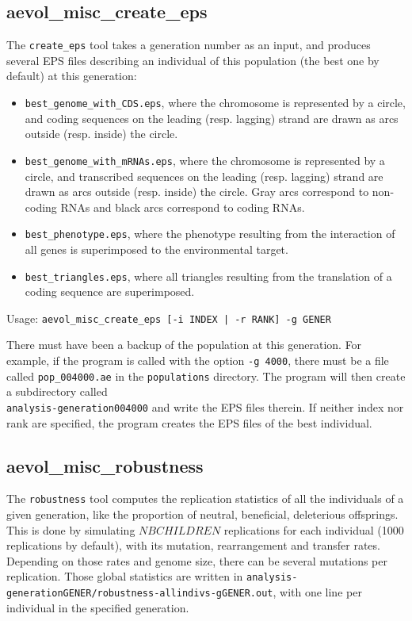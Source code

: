 \subsection{aevol\_misc\_create\_eps}
\label{sect:create-eps}
The \verb?create_eps? tool takes a generation number as an input, and produces several EPS files describing an individual of this population (the best one by default) at this generation:
\begin{itemize}
\item \verb?best_genome_with_CDS.eps?, where the chromosome is represented by a circle, and coding sequences on the leading (resp. lagging) strand are drawn as arcs outside (resp. inside) the circle.
\item \verb?best_genome_with_mRNAs.eps?, where the chromosome is represented by a circle, and transcribed sequences on the leading (resp. lagging) strand are drawn as arcs outside (resp. inside) the circle. Gray arcs correspond to non-coding RNAs and black arcs correspond to coding RNAs.
\item \verb?best_phenotype.eps?, where the phenotype resulting from the interaction of all genes is superimposed to the environmental target.
\item \verb?best_triangles.eps?, where all triangles resulting from the translation of a coding sequence are superimposed.
\end{itemize}

Usage: \verb?aevol_misc_create_eps [-i INDEX | -r RANK] -g GENER?

There must have been a backup of the population at this generation. For example, if the program is called with the option
\verb?-g 4000?, there must be a file called \verb?pop_004000.ae? in the \verb?populations? directory. The program will then create a subdirectory called \\\verb?analysis-generation004000? and write the EPS files therein. If neither index nor rank are specified, the program creates the EPS files of the best individual.

\subsection{aevol\_misc\_robustness}
\label{sect:robustness}

The \verb?robustness? tool computes the replication statistics of all the individuals of a given generation, like the proportion of neutral, beneficial, deleterious offsprings. This is done by simulating $NBCHILDREN$ replications for each individual (1000 replications by default), with its mutation, rearrangement and transfer rates. Depending on those rates and genome size, there can be several mutations per replication. Those global statistics are written in \verb?analysis-generationGENER/robustness-allindivs-gGENER.out?, with one line per individual in the specified generation.

